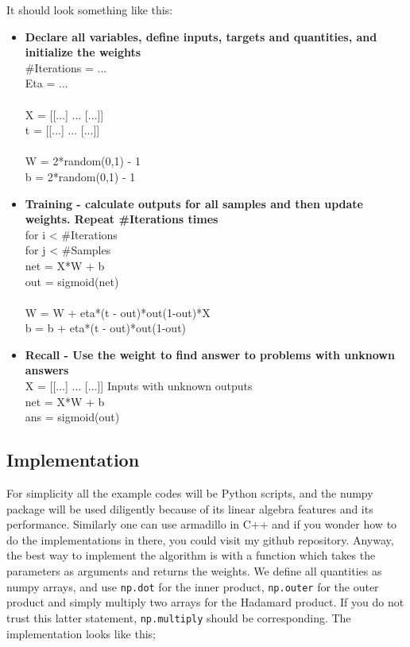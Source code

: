It should look something like this:
\begin{itemize}
	\item \textbf{Declare all variables, define inputs, targets and quantities, and initialize the weights}\\
	\#Iterations = ...\\
	Eta = ...\\
	\\
	X = [[...] ... [...]]\\
	t = [[...] ... [...]]\\
	\\
	W = 2*random(0,1) - 1\\
	b = 2*random(0,1) - 1\\
	
	\item \textbf{Training - calculate outputs for all samples and then update weights. Repeat \#Iterations times}\\
	for i < \#Iterations\\
	for j < \#Samples\\
	net = X*W + b\\
	out = sigmoid(net)\\
	\\
	W = W + eta*(t - out)*out(1-out)*X\\
	b = b + eta*(t - out)*out(1-out)\\
	
	\item \textbf{Recall - Use the weight to find answer to problems with unknown answers}\\
	X = [[...] ... [...]]		Inputs with unknown outputs\\
	net = X*W + b\\
	ans = sigmoid(out)\\
\end{itemize}

\subsection{Implementation}
For simplicity all the example codes will be Python scripts, and the numpy package will be used diligently because of its linear algebra features and its performance. Similarly one can use armadillo in C++ and if you wonder how to do the implementations in there, you could visit my github repository. Anyway, the best way to implement the algorithm is with a function which takes the parameters as arguments and returns the weights. We define all quantities as numpy arrays, and use \lstinline!np.dot! for the inner product, \lstinline!np.outer! for the outer product and simply multiply two arrays for the Hadamard product. If you do not trust this latter statement, \lstinline!np.multiply! should be corresponding. The implementation looks like this;

